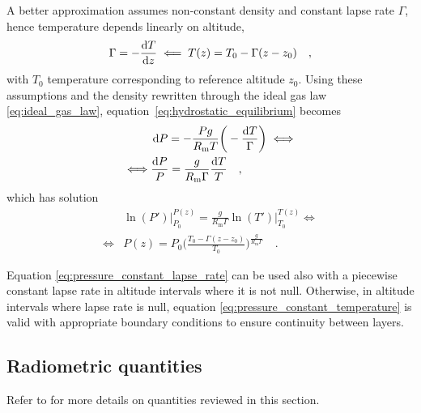\documentclass[a4paper,10pt,twocolumn,\classoptions]{article}
\begin{document}
A better approximation assumes non-constant density and constant lapse rate $\Gamma$, hence temperature depends linearly on altitude,
\begin{equation}
  \label{eq:constant_lapse_rate}
  \Gamma = - \frac{\odif{T}}{\odif{z}} \impliedby T(z) = T_0 - \Gamma (z - z_0)
  \quad ,
\end{equation}
with $T_0$ temperature corresponding to reference altitude $z_0$. Using these assumptions and the density rewritten through the ideal gas law \eqref{eq:ideal_gas_law}, equation~\eqref{eq:hydrostatic_equilibrium} becomes
\begin{equation}
  \label{eq:hydrostatic_equilibrium_ideal_gas_law_constant_lapse_rate}
  \begin{split}
    & \odif{P} = - \frac{P g}{R_\text{m} T} \bigg( - \frac{\odif{T}}{\Gamma} \bigg) \iff \\
    \iff & \frac{\odif{P}}{P} = \frac{g}{R_\text{m} \Gamma} \frac{\odif{T}}{T}
    \quad ,
  \end{split}
\end{equation}
which has solution
\begin{equation}
  \label{eq:pressure_constant_lapse_rate}
  \begin{split}
    & \ln(P') \bigg|_{P_0}^{P(z)} = \frac{g}{R_\text{m} \Gamma} \ln(T') \bigg|_{T_0}^{T(z)} \iff \\
    \iff & P(z) = P_0 \bigg( \frac{T_0 - \Gamma (z - z_0)}{T_0} \bigg)^\frac{g}{R_\text{m} \Gamma}
    \quad .
  \end{split}
\end{equation}

Equation \eqref{eq:pressure_constant_lapse_rate} can be used also with a piecewise constant lapse rate in altitude intervals where it is not null. Otherwise, in altitude intervals where lapse rate is null, equation \eqref{eq:pressure_constant_temperature} is valid with appropriate boundary conditions to ensure continuity between layers.



\subsection{Radiometric quantities}
\label{sec:Radiometric quantities}
Refer to \cite{CIE} for more details on quantities reviewed in this section.
\end{document}
